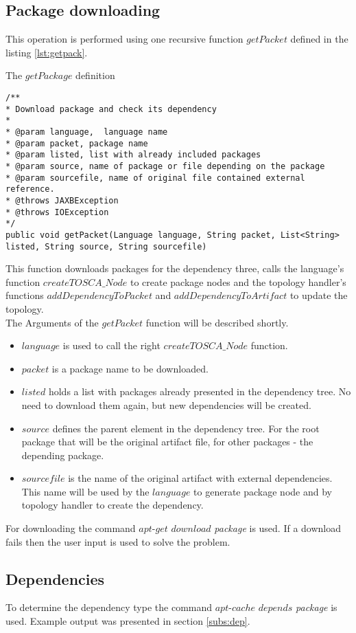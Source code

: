 \subsection*{Package downloading}
This operation is performed using one recursive function $getPacket$ defined in the listing \ref{lst:getpack}.
\begin{Listing}
\caption{The $getPackage$ definition}
\label{lst:getpack}
\begin{lstlisting}
/**
* Download package and check its dependency
* 
* @param language,  language name
* @param packet, package name
* @param listed, list with already included packages
* @param source, name of package or file depending on the package
* @param sourcefile, name of original file contained external reference.
* @throws JAXBException
* @throws IOException
*/
public void getPacket(Language language, String packet, List<String> listed, String source, String sourcefile)
\end{lstlisting}
\end{Listing}
This function downloads packages for the dependency three, calls the language's function $createTOSCA\_Node$ to create package nodes and the topology handler's functions $addDependencyToPacket$ and $addDependencyToArtifact$ to update the topology.\\
The Arguments of the $getPacket$ function will be described shortly.
\begin{itemize}
	\item $language$ is used to call the right $createTOSCA\_Node$ function.
	\item $packet$ is a package name to be downloaded.
	\item $listed$ holds a list with packages already presented in the dependency tree. No need to download them again, but new dependencies will be created.
	\item $source$ defines the parent element in the dependency tree. For the root package that will be the original artifact file, for other packages - the depending package.
	\item $sourcefile$ is the name of the original artifact with external dependencies. This name will be used by the $language$ to generate package node and by topology handler to create the dependency. 
\end{itemize}
For downloading the command $apt$-$get$ $download$ \emph{package} is used. 
If a download fails then the user input is used to solve the problem. 

\subsection*{Dependencies}
To determine the dependency type the command $apt$-$cache$ $depends$  \emph{package} is used.
Example output was presented in section \ref{subs:dep}.

